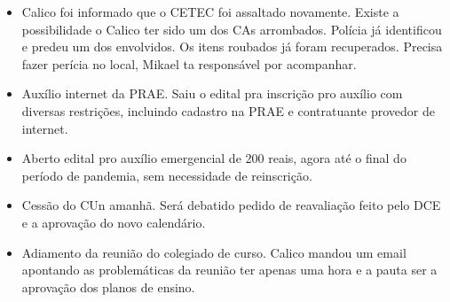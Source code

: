 \documentclass{ata-calico}
\begin{document}
\maketitle

\begin{itemize}
\item Calico foi informado que o CETEC foi assaltado novamente. Existe a possibilidade o Calico ter sido um dos CAs arrombados. Polícia já identificou e predeu um dos envolvidos. Os itens roubados já foram recuperados. Precisa fazer perícia no local, Mikael ta responsável por acompanhar.
\item Auxílio internet da PRAE. Saiu o edital pra inscrição pro auxílio com diversas restrições, incluindo cadastro na PRAE e contratuante provedor de internet.
\item Aberto edital pro auxílio emergencial de 200 reais, agora até o final do período de pandemia, sem necessidade de reinscrição.
\item Cessão do CUn amanhã. Será debatido pedido de reavaliação feito pelo DCE e a aprovação do novo calendário.
\item Adiamento da reunião do colegiado de curso. Calico mandou um email apontando as problemáticas da reunião ter apenas uma hora e a pauta ser a aprovação dos planos de ensino.
\end{itemize}
\end{document}
